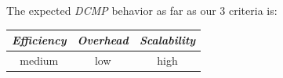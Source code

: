 %
The expected \emph{DCMP} behavior as far as our $3$ criteria is:
%
\begin{center}
{\footnotesize
\begin{tabular}{ccc}
\emph{Efficiency} & \emph{Overhead} & \emph{Scalability} \\
\hline
medium &
low &
high
\end{tabular}
}
\end{center}



